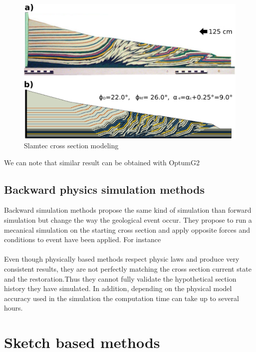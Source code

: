 \documentclass[12pt, a4paper]{report} %
\begin{document}
\begin{figure}[H]
	\centering
	\includegraphics[scale=0.5]{slamtec.png}
	\caption{Slamtec cross section modeling}
	\label{slam}
\end{figure}
We can note that similar result can be obtained with OptumG2 \cite{Optum}
\subsection{Backward physics simulation methods}
Backward simulation methods propose the same kind of simulation than forward simulation but change the way the geological event occur. They propose to run a mecanical simulation on the starting cross section and apply opposite forces and conditions to event have been applied. For instance \\\\
Even though physically based methods respect physic laws and produce very consistent results, they are not perfectly matching the cross section current state and the restoration.Thus they cannot fully validate the hypothetical section history they have simulated. In addition, depending on the physical model accuracy used in the simulation the computation time can take up to several hours.
\section{Sketch based methods}
\end{document}
